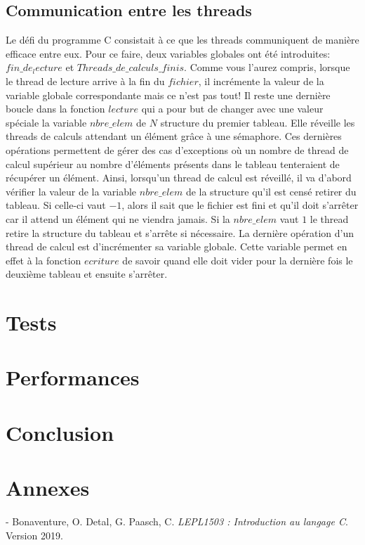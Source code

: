 \documentclass{article}
\begin{document}
\subsection{Communication entre les threads} \label{Com}
Le défi du programme C consistait à ce que les threads communiquent de manière efficace entre eux. Pour ce faire, deux variables globales ont été introduites: $fin\_de_lecture$ et $Threads\_de\_calculs\_finis$. Comme vous l'aurez compris, lorsque le thread de lecture arrive à la fin du $fichier$, il incrémente la valeur de la variable globale correspondante mais ce n'est pas tout! Il reste une dernière boucle dans la fonction $lecture$ qui a pour but de changer avec une valeur spéciale la variable $nbre\_elem$ de $N$ structure du premier tableau. Elle réveille les threads de calculs attendant un élément grâce à une sémaphore.  Ces dernières opérations permettent de gérer des cas d'exceptions où un nombre de thread de calcul supérieur au nombre d'éléments présents dans le tableau tenteraient de récupérer un élément. Ainsi, lorsqu'un thread de calcul est réveillé, il va d'abord vérifier la valeur de la variable $nbre\_elem$ de la structure qu'il est censé retirer du tableau. Si celle-ci vaut $-1$, alors il sait que le fichier est fini et qu'il doit s'arrêter car il attend un élément qui ne viendra jamais. Si la $nbre\_elem$ vaut $1$ le thread retire la structure du tableau et s'arrête si nécessaire. La dernière opération d'un thread de calcul est d'incrémenter sa variable globale. Cette variable permet en effet à la fonction $ecriture$ de savoir quand elle doit vider pour la dernière fois le deuxième tableau et ensuite s'arrêter.

\section{Tests}
\section{Performances}
\section{Conclusion}
\section{Annexes}


- Bonaventure, O. Detal, G. Paasch, C. \textit{LEPL1503 : Introduction au langage C}. Version 2019.
\end{document}
